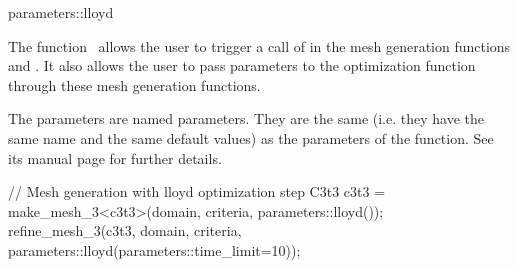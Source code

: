 \ccRefPageBegin


\begin{ccRefFunction}{parameters::lloyd}  %


\ccDefinition
  
The function \ccRefName\ allows the user to trigger a call of
 in the mesh generation functions
 and . It also allows the user to pass
parameters to the optimization function 
 through these mesh generation functions.



\ccParameters

The parameters are named parameters. They are the same (i.e. they have the same
name and the same default values) as the parameters of the 
function. See its manual page for further details.



\ccExample

\begin{ccExampleCode}
// Mesh generation with lloyd optimization step
C3t3 c3t3 = make_mesh_3<c3t3>(domain, criteria, parameters::lloyd());
refine_mesh_3(c3t3, domain, criteria, parameters::lloyd(parameters::time_limit=10));
\end{ccExampleCode}

\ccSeeAlso

 \\
 \\
 \\


\end{ccRefFunction}

\ccRefPageEnd

